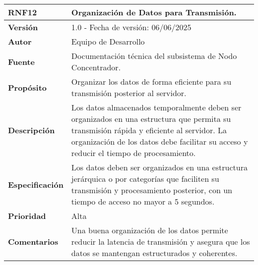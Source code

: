 \begin{longtable}{|l|p{12cm}|}
\hline
\textbf{RNF12} & \textbf{Organización de Datos para Transmisión.} \\
\hline
\endfirsthead
\hline
\textbf{Versión} & 1.0 - Fecha de versión: 06/06/2025 \\
\hline
\textbf{Autor} & Equipo de Desarrollo \\
\hline
\textbf{Fuente} & Documentación técnica del subsistema de Nodo Concentrador. \\
\hline
\textbf{Propósito} & Organizar los datos de forma eficiente para su transmisión posterior al servidor. \\
\hline
\textbf{Descripción} & Los datos almacenados temporalmente deben ser organizados en una estructura que permita su transmisión rápida y eficiente al servidor. La organización de los datos debe facilitar su acceso y reducir el tiempo de procesamiento. \\
\hline
\textbf{Especificación} & Los datos deben ser organizados en una estructura jerárquica o por categorías que faciliten su transmisión y procesamiento posterior, con un tiempo de acceso no mayor a 5 segundos. \\
\hline
\textbf{Prioridad} & Alta \\
\hline
\textbf{Comentarios} & Una buena organización de los datos permite reducir la latencia de transmisión y asegura que los datos se mantengan estructurados y coherentes. \\
\hline
\end{longtable}

